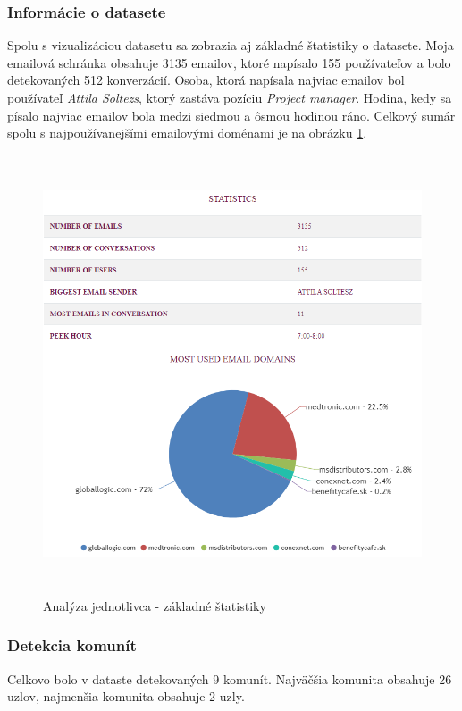 \documentclass[slovak,master,public,dept460,male,cpdeclaration,oneside]{diploma}
\begin{document}
\subsubsection{Informácie o datasete}
Spolu s vizualizáciou datasetu sa zobrazia aj základné štatistiky o datasete. Moja emailová schránka obsahuje 3135 emailov, ktoré napísalo 155 používateľov a bolo detekovaných 512 konverzácií. Osoba, ktorá napísala najviac emailov bol používateľ \textit{Attila Soltezs}, ktorý zastáva pozíciu \textit{Project manager}. Hodina, kedy sa písalo najviac emailov bola medzi siedmou a ôsmou hodinou ráno. Celkový sumár spolu s najpoužívanejšími emailovými doménami je na obrázku \ref{analyza_jednotlivca_stat}.

\begin{figure}[H]
\centering
\includegraphics[width=13cm, height=13cm]{figures/analyza_jednotlivca_stat}
\caption{Analýza jednotlivca - základné štatistiky}
\label{analyza_jednotlivca_stat}
\end{figure}


\subsubsection{Detekcia komunít}
Celkovo bolo v dataste detekovaných 9 komunít. Najväčšia komunita obsahuje 26 uzlov, najmenšia komunita obsahuje 2 uzly. 
\end{document}
